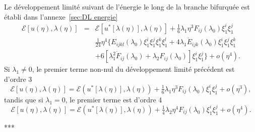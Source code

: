 \documentclass{article}
\newcommand{\mathlambda}{\lambda}
\newcommand{\nobracket}{}
\newcommand{\nocomma}{}
\begin{document}
Le d{\'e}veloppement limit{\'e} suivant de l'{\'e}nergie le long de la branche
bifurqu{\'e}e est {\'e}tabli dans l'annexe~\ref{sec:DL energie}
\begin{eqnarray}
  \mathcal{E} [u (\eta), \lambda (\eta)] & = & \mathcal{E} [u^{\ast} [\lambda
  (\eta)], \lambda (\eta)] + \tfrac{1}{6} \lambda_1 \eta^3 F_{i \nocomma j}
  (\lambda_0) \xi_1^i \xi_1^j \nonumber\\
  &  & \tfrac{1}{24} \eta^4  \{ E_{i \nocomma j \nocomma k \nocomma l}
  (\lambda_0) \xi_1^i \xi_1^j \xi_1^k \xi_1^l + 4 \mathlambda_1  \dot{E}_{i
  \nocomma j \nocomma k} (\lambda_0) \xi_1^i \xi_1^j \xi_1^k \nobracket
  \nonumber\\
  &  & + \nobracket 6 [\mathlambda_1^2  \dot{F}_{i \nocomma j}
  (\mathlambda_0) + \lambda_2 F_{i \nocomma j} (\lambda_0)] \xi_1^i \xi_1^j \}
  + o (\eta^4) .  \label{eq:DL energie}
\end{eqnarray}
Si $\lambda_1 \neq 0$, le premier terme non-nul du d{\'e}veloppement
limit{\'e} pr{\'e}c{\'e}dent est d'ordre 3
\begin{equation}
  \mathcal{E} [u (\eta), \lambda (\eta)] =\mathcal{E} (u^{\ast} [\lambda
  (\eta)], \lambda (\eta)) + \tfrac{1}{6} \lambda_1 \eta^3 F_{i \nocomma j}
  (\lambda_0) \xi_1^i \xi_1^j + o (\eta^3),
\end{equation}
tandis que si $\lambda_1 = 0$, le premier terme est d'ordre 4
\begin{equation}
  \mathcal{E} [u (\eta), \lambda (\eta)] =\mathcal{E} (u^{\ast} [\lambda
  (\eta)], \lambda (\eta)) + \tfrac{1}{4} \lambda_2 \eta^4 F_{i \nocomma j}
  (\lambda_0) \xi_1^i \xi_1^j + o (\eta^4) .
\end{equation}
\begin{center}
  ***
\end{center}
\end{document}
